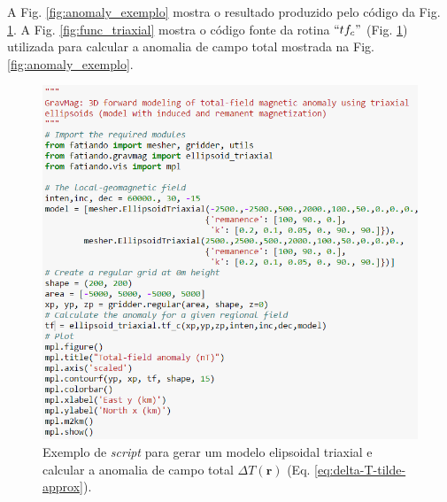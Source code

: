 A Fig. \ref{fig:anomaly_exemplo} mostra o resultado produzido pelo código da Fig. \ref{fig:Cookbook_Triaxial}. A Fig. \ref{fig:func_triaxial} mostra o código fonte da rotina \textit{$``tf_c"$} (Fig. \ref{fig:Cookbook_Triaxial}) utilizada para calcular a anomalia de campo total mostrada na Fig. \ref{fig:anomaly_exemplo}.

\begin{figure}[hbt!]
	\centering \includegraphics[width=16 cm,height=17 cm]{figures/Cookbook_Triaxial}
	\caption[Exemplo de \textit{script} para gerar um modelo elipsoidal triaxial e calcular a anomalia de campo total $\Delta T (\mathbf{r})$ (Eq. \ref{eq:delta-T-tilde-approx}).]{Exemplo de \textit{script} para gerar um modelo elipsoidal triaxial e calcular a anomalia de campo total $\Delta T (\mathbf{r})$ (Eq. \ref{eq:delta-T-tilde-approx}).}
	\label{fig:Cookbook_Triaxial}
\end{figure}

